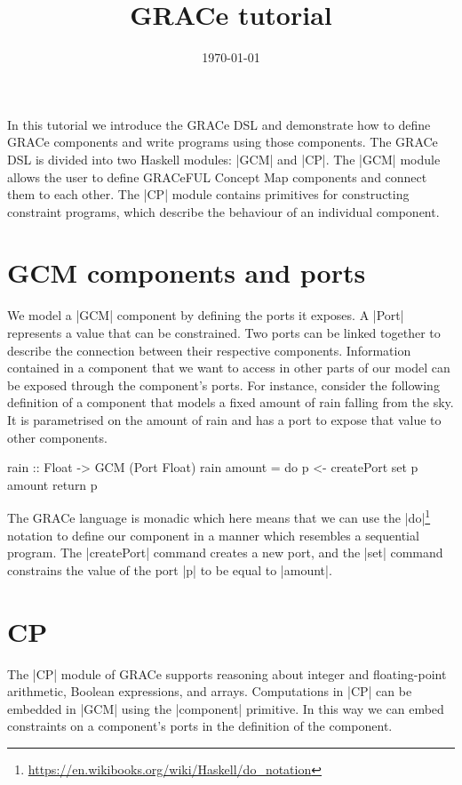 \documentclass[a4paper]{article}
\title{GRACe tutorial}
\author{}
\date{\today}
\begin{document}
\maketitle

\noindent
In this tutorial we introduce the GRACe DSL and demonstrate how to define GRACe
components and write programs using those components. The GRACe DSL is divided
into two Haskell modules: |GCM| and |CP|. The |GCM| module allows the user to
define GRACeFUL Concept Map components and connect them to each other. The |CP|
module contains primitives for constructing constraint programs, which describe
the behaviour of an individual component.


\section{GCM components and ports}

We model a |GCM| component by defining the ports it exposes. A |Port| represents
a value that can be constrained. Two ports can be linked together to describe
the connection between their respective components. Information contained in a
component that we want to access in other parts of our model can be exposed
through the component's ports. For instance, consider the following definition
of a component that models a fixed amount of rain falling from the sky.  It is
parametrised on the amount of rain and has a port to expose that value to other
components.
\begin{haskellcode}
rain :: Float -> GCM (Port Float)
rain amount = do
  p <- createPort
  set p amount
  return p
\end{haskellcode}
The GRACe language is monadic which here means that we can use the
|do|\footnote{\url{https://en.wikibooks.org/wiki/Haskell/do_notation}}
notation to define our component in a manner which resembles a
sequential program. The |createPort| command creates a new port, and
the |set| command constrains the value of the port |p| to be equal to
|amount|.


\section{CP}

The |CP| module of GRACe supports reasoning about integer and floating-point
arithmetic, Boolean expressions, and arrays. Computations in |CP| can be
embedded in |GCM| using the |component| primitive. In this way we can embed
constraints on a component's ports in the definition of the component.
\end{document}
